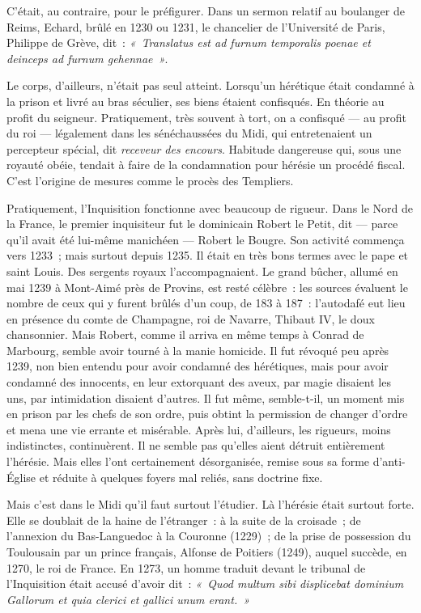 \documentclass[french,twoside]{book} %
\begin{document}
\noindent C’était, au contraire, pour le préfigurer. Dans un sermon relatif au boulanger de Reims, Echard, brûlé en 1230 ou 1231, le chancelier de l’Université de Paris, Philippe de Grève, dit : \emph{« Translatus est ad furnum temporalis poenae et deinceps ad furnum gehennae »}.\par
Le corps, d’ailleurs, n’était pas seul atteint. Lorsqu’un hérétique était condamné à la prison et livré au bras séculier, ses biens étaient confisqués. En théorie au profit du seigneur. Pratiquement, très souvent à tort, on a confisqué — au profit du roi — légalement dans les sénéchaussées du Midi, qui entretenaient un percepteur spécial, dit \emph{receveur des encours}. Habitude dangereuse qui, sous une royauté obéie, tendait à faire de la condamnation pour hérésie un procédé fiscal. C’est l’origine de mesures comme le procès des Templiers.\par
Pratiquement, l’Inquisition fonctionne avec beaucoup de rigueur. Dans le Nord de la France, le premier inquisiteur fut le dominicain Robert le Petit, dit — parce qu’il avait été lui-même manichéen — Robert le Bougre. Son activité commença vers 1233 ; mais surtout depuis 1235. Il était en très bons termes avec le pape et saint Louis. Des sergents royaux l’accompagnaient. Le grand bûcher, allumé en mai 1239 à Mont-Aimé près de Provins, est resté célèbre : les sources évaluent le nombre de ceux qui y furent brûlés d’un coup, de 183 à 187 : l’autodafé eut lieu en présence du comte de Champagne, roi de Navarre, Thibaut IV, le doux chansonnier. Mais Robert, comme il arriva en même temps à Conrad de Marbourg, semble avoir tourné à la manie homicide. Il fut révoqué peu après 1239, non bien entendu pour avoir condamné des hérétiques, mais pour avoir condamné des innocents, en leur extorquant des aveux, par magie disaient les uns, par intimidation disaient d’autres. Il fut même, semble-t-il, un moment mis en prison par les chefs de son ordre, puis obtint la permission de changer d’ordre et mena une vie  
\label{p107} errante et misérable. Après lui, d’ailleurs, les rigueurs, moins indistinctes, continuèrent. Il ne semble pas qu’elles aient détruit entièrement l’hérésie. Mais elles l’ont certainement désorganisée, remise sous sa forme d’anti-Église et réduite à quelques foyers mal reliés, sans doctrine fixe.\par
Mais c’est dans le Midi qu’il faut surtout l’étudier. Là l’hérésie était surtout forte. Elle se doublait de la haine de l’étranger : à la suite de la croisade ; de l’annexion du Bas-Languedoc à la Couronne (1229) ; de la prise de possession du Toulousain par un prince français, Alfonse de Poitiers (1249), auquel succède, en 1270, le roi de France. En 1273, un homme traduit devant le tribunal de l’Inquisition était accusé d’avoir dit : \emph{« Quod multum sibi displicebat dominium Gallorum et quia clerici et gallici unum erant. »}\par
\end{document}
